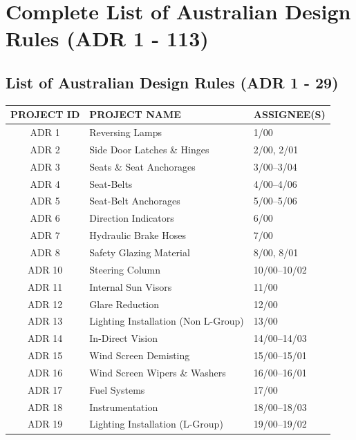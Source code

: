 \newpage
\section{Complete List of Australian Design Rules (ADR 1 - 113)}

    \subsection{List of Australian Design Rules (ADR 1 - 29)}
        \begin{table}[h]
            \centering
            \renewcommand{\arraystretch}{1.2}
            \begin{tabularx}{\textwidth}{|c|X|X|}
            \hline
            \textbf{PROJECT ID} & \textbf{PROJECT NAME} & \textbf{ASSIGNEE(S)} \\
            \hline
            
            ADR 1  & Reversing Lamps & 1/00 \\
            ADR 2  & Side Door Latches \& Hinges & 2/00, 2/01 \\
            ADR 3  & Seats \& Seat Anchorages & 3/00–3/04 \\
            ADR 4  & Seat-Belts & 4/00–4/06 \\
            ADR 5  & Seat-Belt Anchorages & 5/00–5/06 \\
            ADR 6  & Direction Indicators & 6/00 \\
            ADR 7  & Hydraulic Brake Hoses & 7/00 \\
            ADR 8  & Safety Glazing Material & 8/00, 8/01 \\
            
            ADR 10 & Steering Column & 10/00–10/02 \\
            ADR 11 & Internal Sun Visors & 11/00 \\
            ADR 12 & Glare Reduction & 12/00 \\
            ADR 13 & Lighting Installation (Non L-Group) & 13/00 \\
            ADR 14 & In-Direct Vision & 14/00–14/03 \\
            ADR 15 & Wind Screen Demisting & 15/00–15/01 \\
            ADR 16 & Wind Screen Wipers \& Washers & 16/00–16/01 \\
            ADR 17 & Fuel Systems & 17/00 \\
            ADR 18 & Instrumentation & 18/00–18/03 \\
            ADR 19 & Lighting Installation (L-Group) & 19/00–19/02 \\
            

\end{tabularx}
\end{table}
